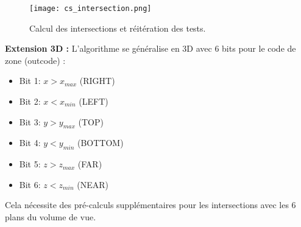\documentclass{article}
\begin{document}
\begin{figure}[H]
\centering
\texttt{[image: cs\_intersection.png]}
\caption{Calcul des intersections et réitération des tests.}
\label{fig:cs_intersection}
\end{figure}

\textbf{Extension 3D :} L'algorithme se généralise en 3D avec 6 bits pour le code de zone (outcode) :
\begin{itemize}
    \item Bit 1: $x > x_{max}$ (RIGHT)
    \item Bit 2: $x < x_{min}$ (LEFT)
    \item Bit 3: $y > y_{max}$ (TOP)
    \item Bit 4: $y < y_{min}$ (BOTTOM)
    \item Bit 5: $z > z_{max}$ (FAR)
    \item Bit 6: $z < z_{min}$ (NEAR)
\end{itemize}
Cela nécessite des pré-calculs supplémentaires pour les intersections avec les 6 plans du volume de vue.
\end{document}
